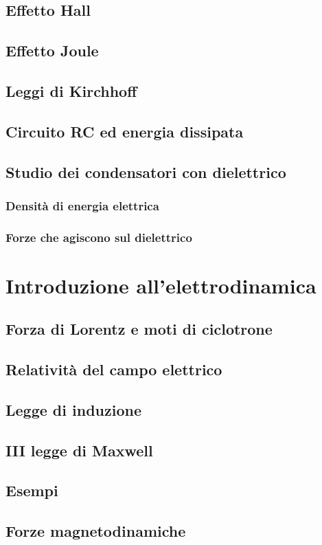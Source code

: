 \documentclass{book}
\begin{document}
\section{Effetto Hall}
\section{Effetto Joule}
\section{Leggi di Kirchhoff}
\section{Circuito RC ed energia dissipata}
\section{Studio dei condensatori con dielettrico}
\subsection{Densit\`a di energia elettrica}
\subsection{Forze che agiscono sul dielettrico}

\chapter{Introduzione all'elettrodinamica}
\section{Forza di Lorentz e moti di ciclotrone}
\section{Relativit\`a del campo elettrico}
\section{Legge di induzione}
\section{III legge di Maxwell}
\section{Esempi}
\section{Forze magnetodinamiche}
\end{document}
